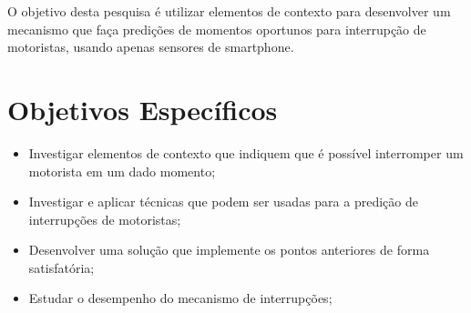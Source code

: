\label{objetivo}
O objetivo desta pesquisa é utilizar elementos de contexto para desenvolver um mecanismo que faça predições de
momentos oportunos para interrupção de motoristas, usando apenas sensores de smartphone.

\section{Objetivos Específicos}
\label{objetivos-esp}
\begin{itemize}
  \item Investigar elementos de contexto que indiquem que é possível interromper um motorista em um dado momento;
  \item Investigar e aplicar técnicas que podem ser usadas para a predição de interrupções de motoristas;
  \item Desenvolver uma solução que implemente os pontos anteriores de forma satisfatória;
  \item Estudar o desempenho do mecanismo de interrupções;
\end{itemize}
